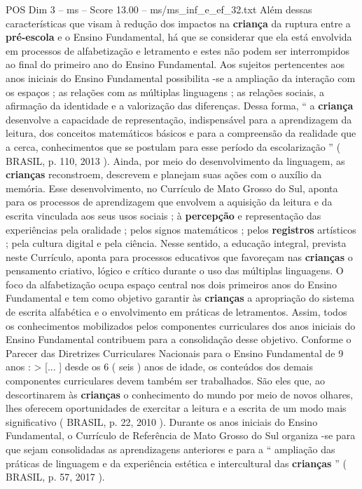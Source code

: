 \begin{textsample}{POS Dim 3 – ms – Score 13.00 – ms/ms\_inf\_e\_ef\_32.txt}
Além dessas características que visam à redução dos impactos na \textbf{criança} da ruptura entre a \textbf{pré-escola} e o Ensino Fundamental, há que se considerar que ela está envolvida em processos de alfabetização e letramento e estes não podem ser interrompidos ao final do primeiro ano do Ensino Fundamental.
Aos sujeitos pertencentes aos anos iniciais do Ensino Fundamental possibilita -se a ampliação da interação com os espaços ; as relações com as múltiplas linguagens ; as relações sociais, a afirmação da identidade e a valorização das diferenças.
Dessa forma, “ a \textbf{criança} desenvolve a capacidade de representação, indispensável para a aprendizagem da leitura, dos conceitos matemáticos básicos e para a compreensão da realidade que a cerca, conhecimentos que se postulam para esse período da escolarização ” ( BRASIL, p. 110, 2013 ).
Ainda, por meio do desenvolvimento da linguagem, as \textbf{crianças} reconstroem, descrevem e planejam suas ações com o auxílio da memória.
Esse desenvolvimento, no Currículo de Mato Grosso do Sul, aponta para os processos de aprendizagem que envolvem a aquisição da leitura e da escrita vinculada aos seus usos sociais ; à \textbf{percepção} e representação das experiências pela oralidade ; pelos signos matemáticos ; pelos \textbf{registros} artísticos ; pela cultura digital e pela ciência.
Nesse sentido, a educação integral, prevista neste Currículo, aponta para processos educativos que favoreçam nas \textbf{crianças} o pensamento criativo, lógico e crítico durante o uso das múltiplas linguagens.
O foco da alfabetização ocupa espaço central nos dois primeiros anos do Ensino Fundamental e tem como objetivo garantir às \textbf{crianças} a apropriação do sistema de escrita alfabética e o envolvimento em práticas de letramentos.
Assim, todos os conhecimentos mobilizados pelos componentes curriculares dos anos iniciais do Ensino Fundamental contribuem para a consolidação desse objetivo.
Conforme o Parecer das Diretrizes Curriculares Nacionais para o Ensino Fundamental de 9 anos : > [... ] desde os 6 ( seis ) anos de idade, os conteúdos dos demais componentes curriculares devem também ser trabalhados.
São eles que, ao descortinarem às \textbf{crianças} o conhecimento do mundo por meio de novos olhares, lhes oferecem oportunidades de exercitar a leitura e a escrita de um modo mais significativo ( BRASIL, p. 22, 2010 ).
Durante os anos iniciais do Ensino Fundamental, o Currículo de Referência de Mato Grosso do Sul organiza -se para que sejam consolidadas as aprendizagens anteriores e para a “ ampliação das práticas de linguagem e da experiência estética e intercultural das \textbf{crianças} ” ( BRASIL, p. 57, 2017 ).

\end{textsample}
